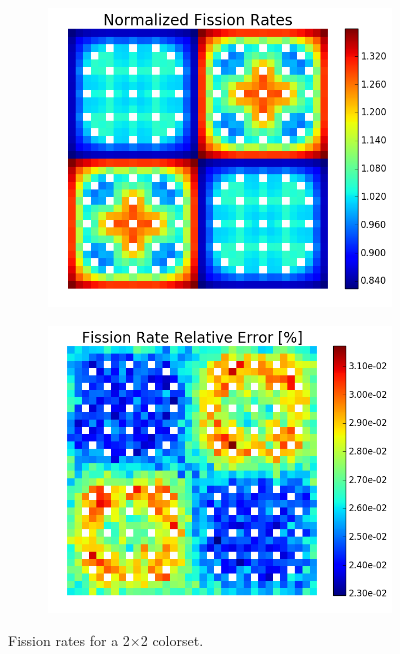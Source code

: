 \begin{figure}[h!]
\centering
\begin{subfigure}{0.44\textwidth}
  \centering
  \includegraphics[width=\linewidth]{figures/benchmarks/fission-rates/fiss-mean-2x2}
  \caption{}
  \label{fig:chap7-fiss-rate-mean-2x2}
\end{subfigure}%
\begin{subfigure}{0.44\textwidth}
  \centering
  \includegraphics[width=\linewidth]{figures/benchmarks/fission-rates/fiss-rel-err-2x2}
  \caption{}
  \label{fig:chap7-fiss-rate-rel-err-2x2}
\end{subfigure}%
\caption[Fission rates for a 2$\times$2 colorset]{Fission rates for a 2$\times$2 colorset.}
\label{fig:chap7-fiss-rates-2x2}
\end{figure}

